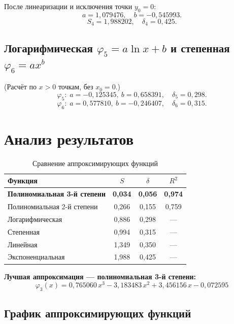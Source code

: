 \documentclass[12pt,a4paper]{article}
\begin{document}
После линеаризации и исключения точки $y_0=0$:
\[
  a = 1{,}079476,\quad b = -0{,}545993.
\]
\[
  S_4 = 1{,}988202, \quad \delta_4 = 0{,}425.
\]

\subsection{Логарифмическая \texorpdfstring{$\varphi_5 = a\ln x+b$}{} и степенная \texorpdfstring{$\varphi_6 = ax^b$}{}}

(Расчёт по $x>0$ точкам, без $x_0=0$.)
\[
  \varphi_5:\; a=-0{,}125345,\ b=0{,}658391,\quad \delta_5=0{,}298.
\]
\[
  \varphi_6:\; a=0{,}577810,\ b=-0{,}246407,\quad \delta_6=0{,}315.
\]

\section{Анализ результатов}

\begin{table}[H]
\centering
\caption{Сравнение аппроксимирующих функций}
\begin{tabular}{l|c|c|c}
\toprule
Функция & $S$ & $\delta$ & $R^2$ \\
\midrule
\textbf{Полиномиальная 3-й степени} & \textbf{0{,}034} & \textbf{0{,}056} & \textbf{0{,}974} \\
Полиномиальная 2-й степени & 0{,}266 & 0{,}155 & 0{,}759 \\
Логарифмическая & 0{,}886 & 0{,}298 & --- \\
Степенная & 0{,}994 & 0{,}315 & --- \\
Линейная & 1{,}349 & 0{,}350 & --- \\
Экспоненциальная & 1{,}988 & 0{,}425 & --- \\
\bottomrule
\end{tabular}
\end{table}

\textbf{Лучшая аппроксимация — полиномиальная 3-й степени:}
\[
  \boxed{\varphi_3(x) = 0{,}765060\,x^3 - 3{,}183483\,x^2 + 3{,}456156\,x - 0{,}072595}
\]

\subsection{График аппроксимирующих функций}
\end{document}
